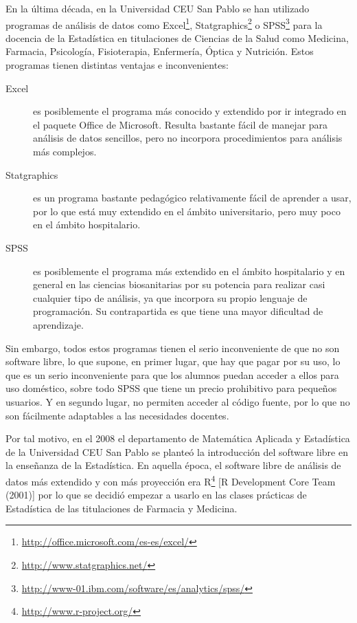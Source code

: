 \documentclass[10pt,twoside,spanish]{article}
\numberwithin{equation}{section}
\begin{document}
En la última década, en la  Universidad CEU San Pablo se han utilizado programas de análisis de datos como
Excel\footnote{\url{http://office.microsoft.com/es-es/excel/}}, Statgraphics\footnote{\url{http://www.statgraphics.net/}} o
SPSS\footnote{\url{http://www-01.ibm.com/software/es/analytics/spss/}} para la docencia de la Estadística en titulaciones de Ciencias de la
Salud como Medicina, Farmacia, Psicología, Fisioterapia, Enfermería, Óptica y Nutrición. 
Estos programas tienen distintas ventajas e inconvenientes:
\begin{description}
\item[Excel] es posiblemente el programa más conocido y extendido por ir integrado en el paquete Office de Microsoft. Resulta
bastante fácil de manejar para análisis de datos sencillos, pero no incorpora procedimientos para análisis más complejos.
\item[ Statgraphics] es un programa bastante pedagógico relativamente fácil de aprender a usar, por lo que está muy extendido en el ámbito
universitario, pero muy poco en el ámbito hospitalario.
\item[SPSS] es posiblemente el programa más extendido en el ámbito hospitalario y en general en las ciencias biosanitarias por su potencia
para realizar casi cualquier tipo de análisis, ya que incorpora su propio lenguaje de programación. 
Su contrapartida es que tiene una mayor dificultad de aprendizaje.
\end{description}
Sin embargo, todos estos programas tienen el serio inconveniente de que no son software libre, lo que supone, en primer lugar, que hay que
pagar por su uso, lo que es un serio inconveniente para que los alumnos puedan acceder a ellos para  uso doméstico, sobre todo SPSS que
tiene un precio prohibitivo para pequeños usuarios.
Y en segundo lugar, no permiten acceder al código fuente, por lo que no son fácilmente adaptables a las necesidades docentes.

Por tal motivo, en el 2008 el departamento de Matemática Aplicada y Estadística de la Universidad CEU San Pablo se
planteó la introducción del software libre en la enseñanza de la Estadística.
En aquella época, el software libre de análisis de datos más extendido y con más proyección era R\footnote{\url{http://www.r-project.org/}}
[R Development Core Team (2001)] por lo que se decidió empezar a usarlo en las clases prácticas de Estadística de las titulaciones de
Farmacia y Medicina.
\end{document}
